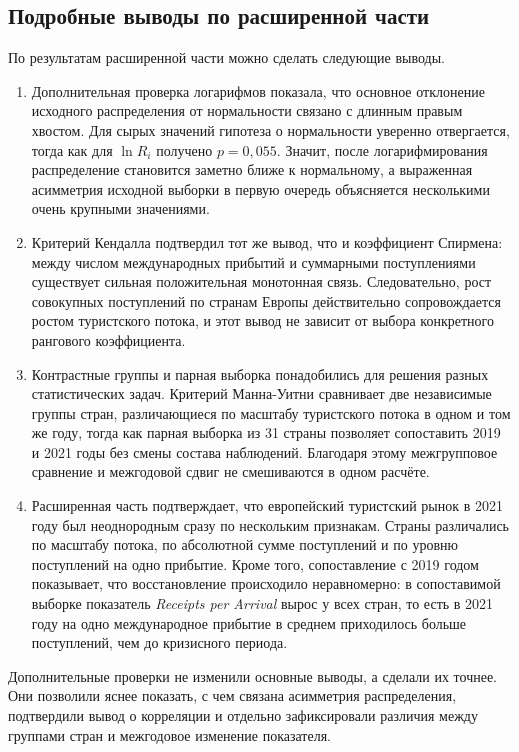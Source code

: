 \documentclass[14pt,a4paper]{extarticle}
\begin{document}
\subsection{Подробные выводы по расширенной части}

По результатам расширенной части можно сделать следующие выводы.

\begin{enumerate}[leftmargin=1.25cm]
    \item Дополнительная проверка логарифмов показала, что основное отклонение исходного распределения от нормальности связано с длинным правым хвостом. Для сырых значений гипотеза о нормальности уверенно отвергается, тогда как для $\ln R_i$ получено $p=0{,}055$. Значит, после логарифмирования распределение становится заметно ближе к нормальному, а выраженная асимметрия исходной выборки в первую очередь объясняется несколькими очень крупными значениями.
    \item Критерий Кендалла подтвердил тот же вывод, что и коэффициент Спирмена: между числом международных прибытий и суммарными поступлениями существует сильная положительная монотонная связь. Следовательно, рост совокупных поступлений по странам Европы действительно сопровождается ростом туристского потока, и этот вывод не зависит от выбора конкретного рангового коэффициента.
    \item Контрастные группы и парная выборка понадобились для решения разных статистических задач. Критерий Манна-Уитни сравнивает две независимые группы стран, различающиеся по масштабу туристского потока в одном и том же году, тогда как парная выборка из 31 страны позволяет сопоставить 2019 и 2021 годы без смены состава наблюдений. Благодаря этому межгрупповое сравнение и межгодовой сдвиг не смешиваются в одном расчёте.
    \item Расширенная часть подтверждает, что европейский туристский рынок в 2021 году был неоднородным сразу по нескольким признакам. Страны различались по масштабу потока, по абсолютной сумме поступлений и по уровню поступлений на одно прибытие. Кроме того, сопоставление с 2019 годом показывает, что восстановление происходило неравномерно: в сопоставимой выборке показатель \textit{Receipts per Arrival} вырос у всех стран, то есть в 2021 году на одно международное прибытие в среднем приходилось больше поступлений, чем до кризисного периода.
\end{enumerate}

Дополнительные проверки не изменили основные выводы, а сделали их точнее. Они позволили яснее показать, с чем связана асимметрия распределения, подтвердили вывод о корреляции и отдельно зафиксировали различия между группами стран и межгодовое изменение показателя.
\end{document}
